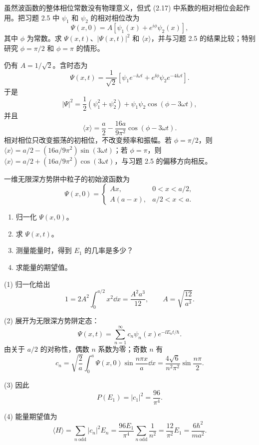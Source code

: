 \begin{question}
虽然波函数的整体相位常数没有物理意义，但式 (2.17) 中系数的相对相位会起作用。把习题 2.5 中 $\psi_1$ 和 $\psi_2$ 的相对相位改为
\[
\Psi(x,0)=A[\psi_1(x)+e^{i\phi}\psi_2(x)],
\]
其中 $\phi$ 为常数。求 $\Psi(x,t)$、$|\Psi(x,t)|^2$ 和 $\langle x\rangle$，并与习题 2.5 的结果比较；特别研究 $\phi=\pi/2$ 和 $\phi=\pi$ 的情形。

\par\smallskip
{}

\end{question}
\begin{solution}
仍有 $A=1/\sqrt2$。含时态为
\[
\Psi(x,t)=\frac1{\sqrt2}\left[\psi_1e^{-\ii\omega t}+e^{\ii\phi}\psi_2e^{-4\ii\omega t}\right].
\]
于是
\[
|\Psi|^2=\frac12(\psi_1^2+\psi_2^2)+\psi_1\psi_2\cos(\phi-3\omega t),
\]
并且
\[
\langle x\rangle=\frac a2-\frac{16a}{9\pi^2}\cos(\phi-3\omega t).
\]
相对相位只改变振荡的初相位，不改变频率和振幅。若 $\phi=\pi/2$，则 $\langle x\rangle=a/2-(16a/9\pi^2)\sin(3\omega t)$；若 $\phi=\pi$，则 $\langle x\rangle=a/2+(16a/9\pi^2)\cos(3\omega t)$，与习题 2.5 的偏移方向相反。
\end{solution}

\begin{question}
一维无限深方势阱中粒子的初始波函数为
\[
\Psi(x,0)=
\begin{cases}
Ax, & 0<x<a/2,\\
A(a-x), & a/2<x<a.
\end{cases}
\]
\begin{enumerate}
\item 归一化 $\Psi(x,0)$。
\item 求 $\Psi(x,t)$。
\item 测量能量时，得到 $E_1$ 的几率是多少？
\item 求能量的期望值。
\end{enumerate}
\end{question}
\begin{solution}
(1) 归一化给出
\[
1=2A^2\int_0^{a/2}x^2\dd x=\frac{A^2a^3}{12},
\qquad
A=\sqrt{\frac{12}{a^3}}.
\]

(2) 展开为无限深方势阱定态：
\[
\Psi(x,t)=\sum_{n=1}^{\infty}c_n\psi_n(x)e^{-\ii E_nt/\hbar}.
\]
由关于 $a/2$ 的对称性，偶数 $n$ 系数为零；奇数 $n$ 有
\[
 c_n=\sqrt{\frac2a}\int_0^a\Psi(x,0)\sin\frac{n\pi x}{a}\dd x
 =\frac{4\sqrt6}{n^2\pi^2}\sin\frac{n\pi}{2}.
\]

(3) 因此
\[
P(E_1)=|c_1|^2=\frac{96}{\pi^4}.
\]

(4) 能量期望值为
\[
\langle H\rangle=\sum_{n\ \mathrm{odd}}|c_n|^2E_n
=\frac{96E_1}{\pi^4}\sum_{n\ \mathrm{odd}}\frac1{n^2}
=\frac{12}{\pi^2}E_1
=\frac{6\hbar^2}{ma^2}.
\]
\end{solution}

